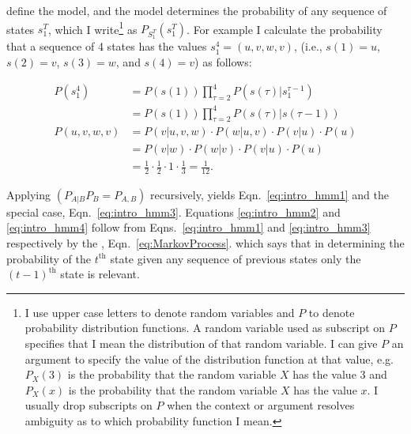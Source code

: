 \documentclass[]{article}
\newcommand{\ts}[3]{#1_{#2}^{#3}}                    %
\newcommand{\ti}[2]{{#1}{(#2)}}                  %
\newcommand{\ie}{i.e.\xspace}
\newcommand{\eg}{e.g.\xspace}
\begin{document}
define the model, and the model determines the probability of any
sequence of states $\ts{s}{1}{T}$, which I write\footnote{I use
  upper case letters to denote random variables and $P$ to denote
  probability distribution functions.  A random variable used as
  subscript on $P$ specifies that I mean the distribution of that
  random variable.  I can give $P$ an argument to specify the value
  of the distribution function at that value, \eg $P_X(3)$ is the
  probability that the random variable $X$ has the value 3 and
  $P_X(x)$ is the probability that the random variable $X$ has the
  value $x$.  I usually drop subscripts on $P$ when the context or
  argument resolves ambiguity as to which probability function I
  mean.} as $P_{\ts{S}{1}{T}}\left( \ts{s}{1}{T} \right)$.  For
example I calculate the probability that a sequence of 4 states has
the values $\ts{s}{1}{4} = (u,v,w,v)$, (\ie, $\ti{s}{1} = u$,
$\ti{s}{2} = v$, $\ti{s}{3} = w$, and $\ti{s}{4} = v$) as follows:


\begin{align}
  \label{eq:intro_hmm1}
  P(\ts{s}{1}{4}) &= P(\ti{s}{1}) \prod_{\tau=2}^4 %
                     P(\ti{s}{\tau}|\ts{s}{1}{\tau-1})\\
  \label{eq:intro_hmm2}
                  &= P(\ti{s}{1}) \prod_{\tau=2}^4 %
                     P(\ti{s}{\tau}|\ti{s}{\tau-1}) \\
  \label{eq:intro_hmm3}
  P(u,v,w,v)      &= P(v|u,v,w) \cdot P(w|u,v) \cdot  P(v|u) \cdot P(u)\\
  \label{eq:intro_hmm4}
        &= P(v|w) \cdot P(w|v) \cdot  P(v|u) \cdot P(u)\\
  \label{eq:intro_hmm5}
        &= \frac{1}{2} \cdot \frac{1}{2} \cdot 1 %
                     \cdot \frac{1}{3} = \frac{1}{12}.
\end{align}

Applying  $\left( P_{A|B} P_B = P_{A,B} \right)$
recursively, yields Eqn.~\eqref{eq:intro_hmm1} and the special case,
Eqn.~\eqref{eq:intro_hmm3}.  Equations \eqref{eq:intro_hmm2} and
\eqref{eq:intro_hmm4} follow from Eqns.~\eqref{eq:intro_hmm1} and
\eqref{eq:intro_hmm3} respectively by the %
\emph{}, Eqn.~\eqref{eq:MarkovProcess}.
which says that in determining the probability of the $t^\text{th}$
state given any sequence of previous states only the $(t-1)^\text{th}$
state is relevant. %
\end{document}
